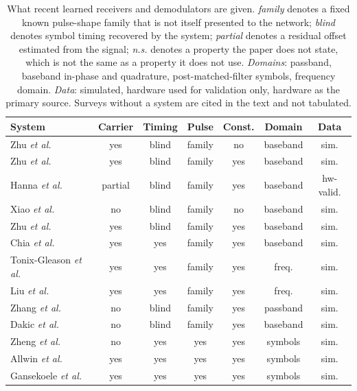 \documentclass[journal]{IEEEtran}   %
\begin{document}
\begin{table}[!t]
\caption{What recent learned receivers and demodulators are given.
\emph{family} denotes a fixed known pulse-shape family that is not itself
presented to the network; \emph{blind} denotes symbol timing recovered by the
system; \emph{partial} denotes a residual offset estimated from the signal;
\emph{n.s.} denotes a property the paper does not state, which is not the same
as a property it does not use. \emph{Domains}: passband, baseband in-phase and
quadrature, post-matched-filter symbols, frequency domain. \emph{Data}: simulated,
hardware used for validation only, hardware as the primary source. Surveys
without a system are cited in the text and not tabulated.}
\label{tab:related_a}
\centering
\begin{tabular}{lcccccc}
\toprule
System & Carrier & Timing & Pulse & Const. & Domain & Data \\
\midrule
Zhu \textit{et al.}~\cite{Zhu2022WaveformLevelIntelligence} & yes & blind & family & no & baseband & sim. \\
Zhu \textit{et al.}~\cite{Zhu2022EndtoEnd} & yes & blind & family & yes & baseband & sim. \\
Hanna \textit{et al.}~\cite{Hanna2022SignalProcessing} & partial & blind & family & yes & baseband & hw-valid. \\
Xiao \textit{et al.}~\cite{Xiao2023_UnifiedDeep} & no & blind & family & no & baseband & sim. \\
Zhu \textit{et al.}~\cite{Zhu2023DLWave} & yes & blind & family & yes & baseband & sim. \\
Chia \textit{et al.}~\cite{Chia2022RN} & yes & yes & family & yes & baseband & sim. \\
Tonix-Gleason \textit{et al.}~\cite{Tonix2025NNAided} & yes & yes & family & yes & freq. & sim. \\
Liu \textit{et al.}~\cite{liu2026Universal} & yes & yes & family & yes & freq. & sim. \\
Zhang \textit{et al.}~\cite{Zhang2018Enhanced} & no & blind & family & yes & passband & sim. \\
Dakic \textit{et al.}~\cite{dakic2021LoRa} & no & blind & family & yes & baseband & sim. \\
Zheng \textit{et al.}~\cite{Zheng2022DemodNet} & no & yes & yes & yes & symbols & sim. \\
Allwin \textit{et al.}~\cite{alwin2024LLRSymNet} & yes & yes & yes & yes & symbols & sim. \\
Gansekoele \textit{et al.}~\cite{ganse2024MLApprochDemapping} & yes & yes & yes & yes & symbols & sim. \\

\end{tabular}
\end{table}
\end{document}
